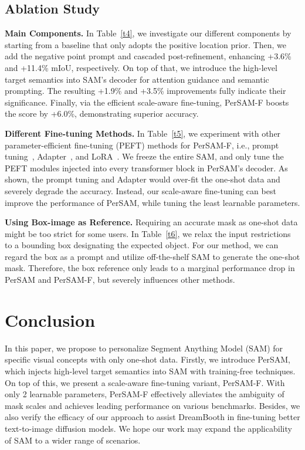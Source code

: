 \documentclass{article} \usepackage{iclr2024_conference,times}
\begin{document}
\subsection{Ablation Study}
\label{s4.4}

\textbf{Main Components.} In Table~\ref{t4}, we investigate our different components by starting from a baseline that only adopts the positive location prior. Then, we add the negative point prompt and cascaded post-refinement, enhancing +3.6\% and +11.4\% mIoU, respectively.
On top of that, we introduce the high-level target semantics into SAM's decoder for attention guidance and semantic prompting. The resulting +1.9\% and +3.5\% improvements fully indicate their significance. Finally, via the efficient scale-aware fine-tuning, PerSAM-F boosts the score by +6.0\%, demonstrating superior accuracy.


\textbf{Different Fine-tuning Methods.}
In Table~\ref{t5}, we experiment with other parameter-efficient fine-tuning (PEFT) methods for PerSAM-F, i.e., prompt tuning~\citep{liu2021p-tuning}, Adapter~\citep{houlsby2019parameter}, and LoRA~\citep{hu2021lora}. We freeze the entire SAM, and only tune the PEFT modules injected into every transformer block in PerSAM's decoder.
As shown, the prompt tuning and Adapter would over-fit the one-shot data and severely degrade the accuracy. Instead, our scale-aware fine-tuning can best improve the performance of PerSAM, while tuning the least learnable parameters.


\textbf{Using Box-image as Reference.}
Requiring an accurate mask as one-shot data might be too strict for some users.
In Table~\ref{t6}, we relax the input restrictions to a bounding box designating the expected object.
For our method, we can regard the box as a prompt and utilize off-the-shelf SAM to generate the one-shot mask. Therefore, the box reference only leads to a marginal performance drop in PerSAM and PerSAM-F, but severely influences other methods.
\vspace{-0.1cm}

\section{Conclusion}

In this paper, we propose to personalize Segment Anything Model (SAM) for specific visual concepts with only one-shot data. Firstly, we introduce PerSAM, which injects high-level target semantics into SAM with training-free techniques. On top of this, we present a scale-aware fine-tuning variant, PerSAM-F. With only 2 learnable parameters, PerSAM-F effectively alleviates the ambiguity of mask scales and achieves leading performance on various benchmarks. Besides, we also verify the efficacy of our approach to assist DreamBooth in fine-tuning better text-to-image diffusion models. 
We hope our work may expand the applicability of SAM to a wider range of scenarios.
\end{document}
